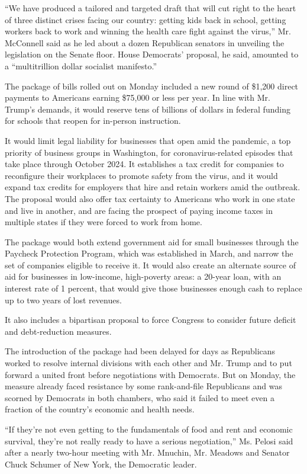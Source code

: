 ``We have produced a tailored and targeted draft that will cut right to
the heart of three distinct crises facing our country: getting kids back
in school, getting workers back to work and winning the health care
fight against the virus,'' Mr. McConnell said as he led about a dozen
Republican senators in unveiling the legislation on the Senate floor.
House Democrats' proposal, he said, amounted to a ``multitrillion dollar
socialist manifesto.''

The package of bills rolled out on Monday included a new round of
\$1,200 direct payments to Americans earning \$75,000 or less per year.
In line with Mr. Trump's demands, it would reserve tens of billions of
dollars in federal funding for schools that reopen for in-person
instruction.

It would limit legal liability for businesses that open amid the
pandemic, a top priority of business groups in Washington, for
coronavirus-related episodes that take place through October 2024. It
establishes a tax credit for companies to reconfigure their workplaces
to promote safety from the virus, and it would expand tax credits for
employers that hire and retain workers amid the outbreak. The proposal
would also offer tax certainty to Americans who work in one state and
live in another, and are facing the prospect of paying income taxes in
multiple states if they were forced to work from home.

The package would both extend government aid for small businesses
through the Paycheck Protection Program, which was established in March,
and narrow the set of companies eligible to receive it. It would also
create an alternate source of aid for businesses in low-income,
high-poverty areas: a 20-year loan, with an interest rate of 1 percent,
that would give those businesses enough cash to replace up to two years
of lost revenues.

It also includes a bipartisan proposal to force Congress to consider
future deficit and debt-reduction measures.

The introduction of the package had been delayed for days as Republicans
worked to resolve internal divisions with each other and Mr. Trump and
to put forward a united front before negotiations with Democrats. But on
Monday, the measure already faced resistance by some rank-and-file
Republicans and was scorned by Democrats in both chambers, who said it
failed to meet even a fraction of the country's economic and health
needs.

``If they're not even getting to the fundamentals of food and rent and
economic survival, they're not really ready to have a serious
negotiation,'' Ms. Pelosi said after a nearly two-hour meeting with Mr.
Mnuchin, Mr. Meadows and Senator Chuck Schumer of New York, the
Democratic leader.

